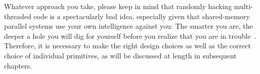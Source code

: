 Whatever approach you take, please keep in mind that randomly hacking
multi-threaded code is a spectacularly bad idea, especially given that
shared-memory parallel systems use your own intelligence against you:
The smarter you are, the deeper a hole you will dig for yourself before
you realize that you are in trouble~\cite{DeadlockEmpire2016}.
Therefore, it is necessary to make the right design choices as well as
the correct choice of individual primitives,
as will be discussed at length in subsequent chapters.

